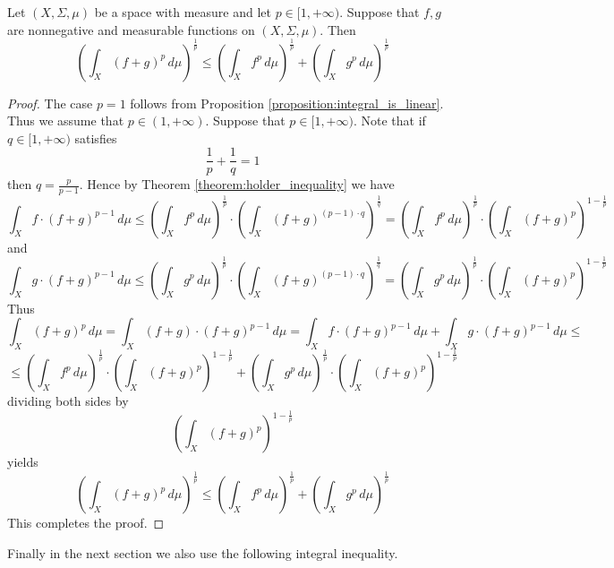 \documentclass[10pt]{amsart}
\begin{document}
\begin{corollary}[Minkowski]\label{corollary:Minkowski_inequality}
	Let $(X,\Sigma,\mu)$ be a space with measure and let $p \in [1,+\infty)$. Suppose that $f,g$ are nonnegative and measurable functions on $(X,\Sigma,\mu)$. Then
	$$\left(\int_X\left(f + g\right)^p\,d\mu\right)^{\frac{1}{p}} \leq \left(\int_X f^p\,d\mu\right)^{\frac{1}{p}} + \left(\int_X g^p\,d\mu\right)^{\frac{1}{p}}$$
\end{corollary}
\begin{proof}
	The case $p = 1$ follows from Proposition \ref{proposition:integral_is_linear}. Thus we assume that $p \in (1,+\infty)$. Suppose that $p \in [1,+\infty)$. Note that if $q \in [1,+\infty)$ satisfies
	$$\frac{1}{p} + \frac{1}{q} = 1$$
	then $q = \frac{p}{p-1}$. Hence by Theorem \ref{theorem:holder_inequality} we have
	$$\int_Xf \cdot \left(f + g\right)^{p-1}\,d\mu \leq \left(\int_X f^p\,d\mu\right)^{\frac{1}{p}}\cdot \left(\int_X\left(f + g\right)^{(p-1)\cdot q}\right)^{\frac{1}{q}} = \left(\int_X f^p\,d\mu\right)^{\frac{1}{p}}\cdot \left(\int_X\left(f + g\right)^{p}\right)^{1 - \frac{1}{p}}$$
	and
	$$\int_Xg \cdot \left(f + g\right)^{p-1}\,d\mu \leq \left(\int_X g^p\,d\mu\right)^{\frac{1}{p}}\cdot \left(\int_X\left(f + g\right)^{(p-1)\cdot q}\right)^{\frac{1}{q}} = \left(\int_X g^p\,d\mu\right)^{\frac{1}{p}}\cdot \left(\int_X\left(f + g\right)^{p}\right)^{1 - \frac{1}{p}}$$
	Thus
	$$\int_X\left(f+g\right)^p\,d\mu = \int_X\left(f + g\right)\cdot \left(f + g\right)^{p-1}\,d\mu = \int_Xf \cdot \left(f + g\right)^{p-1}\,d\mu + \int_Xg\cdot \left(f + g\right)^{p-1}\,d\mu \leq $$
	$$\leq \left(\int_X f^p\,d\mu\right)^{\frac{1}{p}}\cdot \left(\int_X\left(f + g\right)^{p}\right)^{1 - \frac{1}{p}} + \left(\int_X g^p\,d\mu\right)^{\frac{1}{p}}\cdot \left(\int_X\left(f + g\right)^{p}\right)^{1 - \frac{1}{p}}$$
	dividing both sides by
	$$\left(\int_X\left(f + g\right)^{p}\right)^{1 - \frac{1}{p}}$$
	yields
	$$\left(\int_X\left(f + g\right)^p\,d\mu\right)^{\frac{1}{p}} \leq \left(\int_X f^p\,d\mu\right)^{\frac{1}{p}} + \left(\int_X g^p\,d\mu\right)^{\frac{1}{p}}$$
	This completes the proof.
\end{proof}
\noindent
Finally in the next section we also use the following integral inequality.
\end{document}
